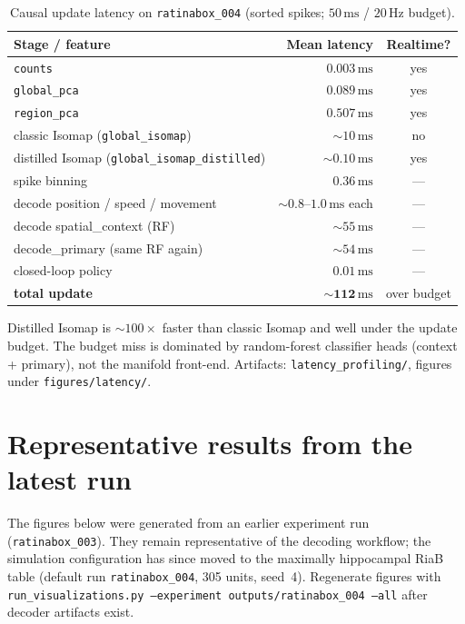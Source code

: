 \documentclass[11pt,a4paper]{article}
\begin{document}
\begin{table}[h]
\centering
\caption{Causal update latency on \texttt{ratinabox\_004} (sorted spikes; $50\,\mathrm{ms}$ / $20\,\mathrm{Hz}$ budget).}
\label{tab:latency}
\small
\begin{tabular}{@{}lrc@{}}
\toprule
Stage / feature & Mean latency & Realtime? \\
\midrule
\texttt{counts} & $0.003\,\mathrm{ms}$ & yes \\
\texttt{global\_pca} & $0.089\,\mathrm{ms}$ & yes \\
\texttt{region\_pca} & $0.507\,\mathrm{ms}$ & yes \\
classic Isomap (\texttt{global\_isomap}) & ${\sim}10\,\mathrm{ms}$ & no \\
distilled Isomap (\texttt{global\_isomap\_distilled}) & ${\sim}0.10\,\mathrm{ms}$ & yes \\
spike binning & $0.36\,\mathrm{ms}$ & --- \\
decode position / speed / movement & ${\sim}0.8$--$1.0\,\mathrm{ms}$ each & --- \\
decode spatial\_context (RF) & ${\sim}55\,\mathrm{ms}$ & --- \\
decode\_primary (same RF again) & ${\sim}54\,\mathrm{ms}$ & --- \\
closed-loop policy & $0.01\,\mathrm{ms}$ & --- \\
\textbf{total update} & ${\sim}\mathbf{112\,\mathrm{ms}}$ & over budget \\
\bottomrule
\end{tabular}
\end{table}

Distilled Isomap is ${\sim}100\times$ faster than classic Isomap and well under the update budget.
The budget miss is dominated by random-forest classifier heads (context + primary), not the manifold front-end.
Artifacts: \texttt{latency\_profiling/}, figures under \texttt{figures/latency/}.


\section{Representative results from the latest run}
\label{sec:latest-results}

The figures below were generated from an earlier experiment run (\texttt{ratinabox\_003}).
They remain representative of the decoding workflow; the simulation configuration has since moved to the maximally hippocampal RiaB table (default run \texttt{ratinabox\_004}, 305 units, seed~4).
Regenerate figures with \texttt{run\_visualizations.py --experiment outputs/ratinabox\_004 --all} after decoder artifacts exist.
\end{document}
